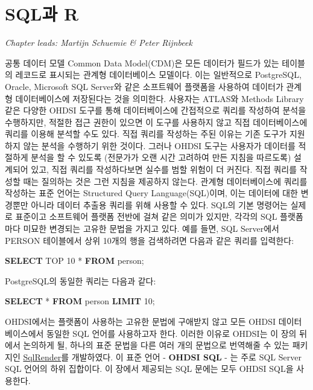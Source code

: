 \documentclass[10.5pt]{book}
\newenvironment{Shaded}{\begin{snugshade}}{\end{snugshade}}
\newcommand{\KeywordTok}[1]{\textcolor[rgb]{0.13,0.29,0.53}{\textbf{#1}}}
\newcommand{\DecValTok}[1]{\textcolor[rgb]{0.00,0.00,0.81}{#1}}
\newcommand{\NormalTok}[1]{#1}
\theoremstyle{definition}
\theoremstyle{definition}
\theoremstyle{definition}
\theoremstyle{remark}
\begin{document}
\chapter{SQL과 R}\label{SqlAndR}

\emph{Chapter leads: Martijn Schuemie \& Peter Rijnbeek}

공통 데이터 모델 Common Data Model(CDM)은 모든 데이터가 필드가 있는
테이블의 레코드로 표시되는 관계형 데이터베이스 모델이다. 이는 일반적으로
PostgreSQL, Oracle, Microsoft SQL Server와 같은 소프트웨어 플랫폼을
사용하여 데이터가 관계형 데이터베이스에 저장된다는 것을 의미한다.
사용자는 ATLAS와 Methods Library 같은 다양한 OHDSI 도구를 통해
데이터베이스에 간접적으로 쿼리를 작성하여 분석을 수행하지만, 적절한 접근
권한이 있으면 이 도구를 사용하지 않고 직접 데이터베이스에 쿼리를 이용해
분석할 수도 있다. 직접 쿼리를 작성하는 주된 이유는 기존 도구가 지원하지
않는 분석을 수행하기 위한 것이다. 그러나 OHDSI 도구는 사용자가 데이터를
적절하게 분석을 할 수 있도록 (전문가가 오랜 시간 고려하여 만든 지침을
따르도록) 설계되어 있고, 직접 쿼리를 작성하다보면 실수를 범할 위험이 더
커진다. 직접 쿼리를 작성할 때는 질의하는 것은 그런 지침을 제공하지
않는다. 관계형 데이터베이스에 쿼리를 작성하는 표준 언어는 Structured
Query Language(SQL)이며, 이는 데이터에 대한 변경뿐만 아니라 데이터
추출용 쿼리를 위해 사용할 수 있다. SQL의 기본 명령어는 실제로 표준이고
소프트웨어 플랫폼 전반에 걸쳐 같은 의미가 있지만, 각각의 SQL 플랫폼마다
미묘한 변경되는 고유한 문법을 가지고 있다. 예를 들면, SQL Server에서
PERSON 테이블에서 상위 10개의 행을 검색하려면 다음과 같은 쿼리를
입력한다:  

\begin{Shaded}
\begin{Highlighting}[]
\KeywordTok{SELECT}\NormalTok{ TOP }\DecValTok{10}\NormalTok{ * }\KeywordTok{FROM}\NormalTok{ person;}
\end{Highlighting}
\end{Shaded}

PostgreSQL의 동일한 쿼리는 다음과 같다:

\begin{Shaded}
\begin{Highlighting}[]
\KeywordTok{SELECT}\NormalTok{ * }\KeywordTok{FROM}\NormalTok{ person }\KeywordTok{LIMIT} \DecValTok{10}\NormalTok{;}
\end{Highlighting}
\end{Shaded}

OHDSI에서는 플랫폼이 사용하는 고유한 문법에 구애받지 않고 모든 OHDSI
데이터베이스에서 동일한 SQL 언어를 사용하고자 한다. 이러한 이유로
OHDSI는 이 장의 뒤에서 논의하게 될, 하나의 표준 문법을 다른 여러 개의
문법으로 번역해줄 수 있는 패키지인
\href{https://ohdsi.github.io/SqlRender/}{SqlRender}를 개발하였다. 이
표준 언어 - \textbf{OHDSI SQL} - 는 주로 SQL Server SQL 언어의 하위
집합이다. 이 장에서 제공되는 SQL 문에는 모두 OHDSI SQL을 사용한다.
 
\end{document}
